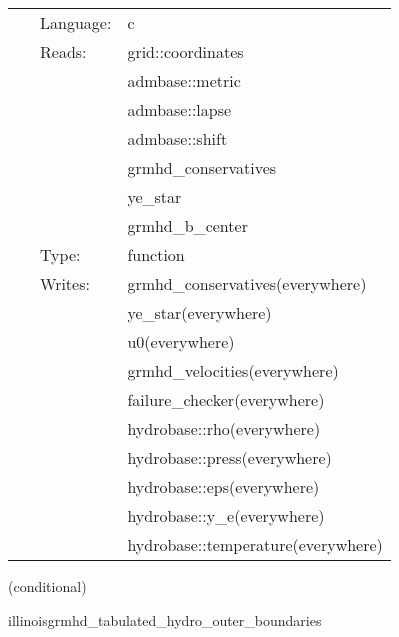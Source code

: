 \documentclass{article}
\begin{document}
\hspace{5mm}{\it tabulated version of illinoisgrmhd\_conservs\_to\_prims } 


\hspace{5mm}

 \begin{tabular*}{160mm}{cll} 
~ & Language:  & c \\ 
~ & Reads:  & grid::coordinates \\ 
~& ~ &admbase::metric\\ 
~& ~ &admbase::lapse\\ 
~& ~ &admbase::shift\\ 
~& ~ &grmhd\_conservatives\\ 
~& ~ &ye\_star\\ 
~& ~ &grmhd\_b\_center\\ 
~ & Type:  & function \\ 
~ & Writes:  & grmhd\_conservatives(everywhere) \\ 
~& ~ &ye\_star(everywhere)\\ 
~& ~ &u0(everywhere)\\ 
~& ~ &grmhd\_velocities(everywhere)\\ 
~& ~ &failure\_checker(everywhere)\\ 
~& ~ &hydrobase::rho(everywhere)\\ 
~& ~ &hydrobase::press(everywhere)\\ 
~& ~ &hydrobase::eps(everywhere)\\ 
~& ~ &hydrobase::y\_e(everywhere)\\ 
~& ~ &hydrobase::temperature(everywhere)\\ 
\end{tabular*} 


\vspace{5mm}

   (conditional) 

\hspace{5mm} illinoisgrmhd\_tabulated\_hydro\_outer\_boundaries 

\hspace{5mm}{\it tabulated version of illinoisgrmhd\_outer\_boundaries } 


\hspace{5mm}
\end{document}
